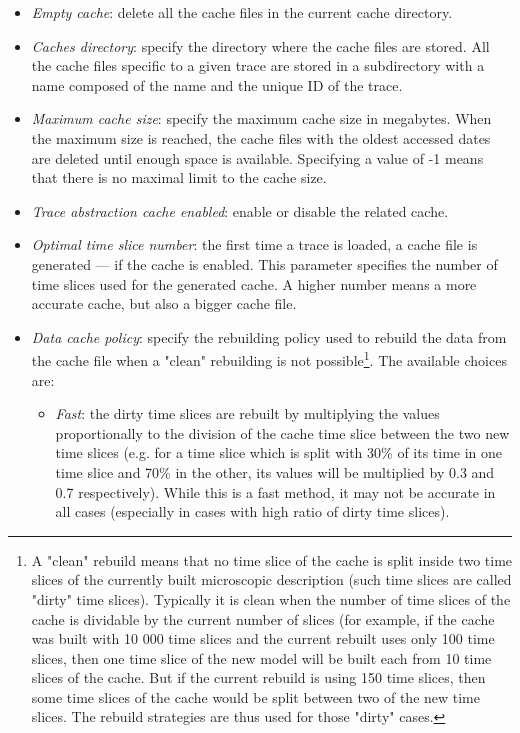 \documentclass[twoside]{article}
\begin{document}
\begin{sloppypar}
\begin{itemize}
	\item \textit{Empty cache}: delete all the cache files in the current cache directory.
	\item \textit{Caches directory}: specify the directory where the cache files are stored. All the cache files specific to a given trace are stored in a subdirectory with a name composed of the name and the unique ID of the trace.
	\item \textit{Maximum cache size}: specify the maximum cache size in megabytes. When the maximum size is reached, the cache files with the oldest accessed dates are deleted until enough space is available. Specifying a value of -1 means that there is no maximal limit to the cache size.
	\item \textit{Trace abstraction cache enabled}: enable or disable the related cache.
	\item \textit{Optimal time slice number}: the first time a trace is loaded, a cache file is generated --- if the cache is enabled. This parameter specifies the number of time slices used for the generated cache. A higher number means a more accurate cache, but also a bigger cache file.
	\item \textit{Data cache policy}: specify the rebuilding policy used to rebuild the data from the cache file when a "clean" rebuilding is not possible\footnote{A "clean" rebuild means that no time slice of the cache is split inside two time slices of the currently built microscopic description (such time slices are called "dirty" time slices). Typically it is clean when the number of time slices of the cache is dividable by the current number of slices (for example, if the cache was built with 10 000 time slices and the current rebuilt uses only 100 time slices, then one time slice of the new model will be built each from 10 time slices of the cache. But if the current rebuild is using 150 time slices, then some time slices of the cache would be split between two of the new time slices. The rebuild strategies are thus used for those "dirty" cases.}. The available choices are:
	\begin{itemize}
		\item \textit{Fast}: the dirty time slices are rebuilt by multiplying the values proportionally to the division of the cache time slice between the two new time slices (e.g. for a time slice which is split with 30\% of its time in one time slice and 70\% in the other, its values will be multiplied by 0.3 and 0.7 respectively). While this is a fast method, it may not be accurate in all cases (especially in cases with high ratio of dirty time slices).

\end{itemize}
\end{itemize}
\end{sloppypar}
\end{document}
